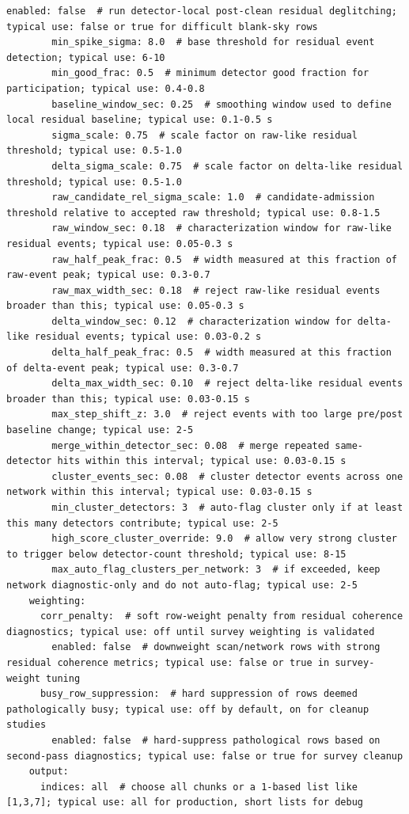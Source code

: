 \documentclass[11pt]{article}
\begin{document}
\begin{lstlisting}[language={}]
        enabled: false  # run detector-local post-clean residual deglitching; typical use: false or true for difficult blank-sky rows
        min_spike_sigma: 8.0  # base threshold for residual event detection; typical use: 6-10
        min_good_frac: 0.5  # minimum detector good fraction for participation; typical use: 0.4-0.8
        baseline_window_sec: 0.25  # smoothing window used to define local residual baseline; typical use: 0.1-0.5 s
        sigma_scale: 0.75  # scale factor on raw-like residual threshold; typical use: 0.5-1.0
        delta_sigma_scale: 0.75  # scale factor on delta-like residual threshold; typical use: 0.5-1.0
        raw_candidate_rel_sigma_scale: 1.0  # candidate-admission threshold relative to accepted raw threshold; typical use: 0.8-1.5
        raw_window_sec: 0.18  # characterization window for raw-like residual events; typical use: 0.05-0.3 s
        raw_half_peak_frac: 0.5  # width measured at this fraction of raw-event peak; typical use: 0.3-0.7
        raw_max_width_sec: 0.18  # reject raw-like residual events broader than this; typical use: 0.05-0.3 s
        delta_window_sec: 0.12  # characterization window for delta-like residual events; typical use: 0.03-0.2 s
        delta_half_peak_frac: 0.5  # width measured at this fraction of delta-event peak; typical use: 0.3-0.7
        delta_max_width_sec: 0.10  # reject delta-like residual events broader than this; typical use: 0.03-0.15 s
        max_step_shift_z: 3.0  # reject events with too large pre/post baseline change; typical use: 2-5
        merge_within_detector_sec: 0.08  # merge repeated same-detector hits within this interval; typical use: 0.03-0.15 s
        cluster_events_sec: 0.08  # cluster detector events across one network within this interval; typical use: 0.03-0.15 s
        min_cluster_detectors: 3  # auto-flag cluster only if at least this many detectors contribute; typical use: 2-5
        high_score_cluster_override: 9.0  # allow very strong cluster to trigger below detector-count threshold; typical use: 8-15
        max_auto_flag_clusters_per_network: 3  # if exceeded, keep network diagnostic-only and do not auto-flag; typical use: 2-5
    weighting:
      corr_penalty:  # soft row-weight penalty from residual coherence diagnostics; typical use: off until survey weighting is validated
        enabled: false  # downweight scan/network rows with strong residual coherence metrics; typical use: false or true in survey-weight tuning
      busy_row_suppression:  # hard suppression of rows deemed pathologically busy; typical use: off by default, on for cleanup studies
        enabled: false  # hard-suppress pathological rows based on second-pass diagnostics; typical use: false or true for survey cleanup
    output:
      indices: all  # choose all chunks or a 1-based list like [1,3,7]; typical use: all for production, short lists for debug


\end{lstlisting}
\end{document}
